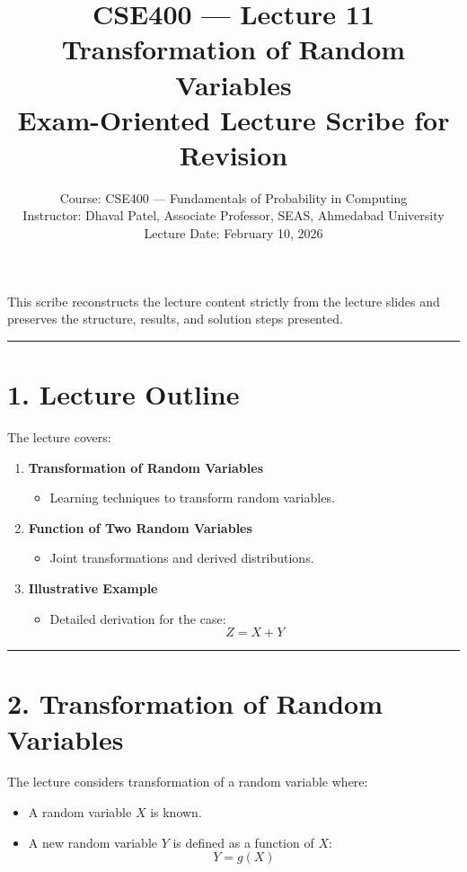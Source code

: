 \documentclass[11pt]{article}
\title{\textbf{CSE400 — Lecture 11}\\
Transformation of Random Variables\\
\large Exam-Oriented Lecture Scribe for Revision}
\author{
Course: CSE400 — Fundamentals of Probability in Computing\\
Instructor: Dhaval Patel, Associate Professor, SEAS, Ahmedabad University\\
Lecture Date: February 10, 2026
}
\date{}
\begin{document}
\maketitle

This scribe reconstructs the lecture content strictly from the lecture slides and preserves the structure, results, and solution steps presented.

\hrule
\vspace{0.5em}

\section*{1. Lecture Outline}

The lecture covers:

\begin{enumerate}
    \item \textbf{Transformation of Random Variables}
    \begin{itemize}
        \item Learning techniques to transform random variables.
    \end{itemize}

    \item \textbf{Function of Two Random Variables}
    \begin{itemize}
        \item Joint transformations and derived distributions.
    \end{itemize}

    \item \textbf{Illustrative Example}
    \begin{itemize}
        \item Detailed derivation for the case:
        \[
        Z = X + Y
        \]
    \end{itemize}
\end{enumerate}

\hrule
\vspace{0.5em}

\section*{2. Transformation of Random Variables}

The lecture considers transformation of a random variable where:

\begin{itemize}
    \item A random variable \(X\) is known.
    \item A new random variable \(Y\) is defined as a function of \(X\):
    \[
    Y = g(X)
    \]
\end{itemize}
\end{document}
